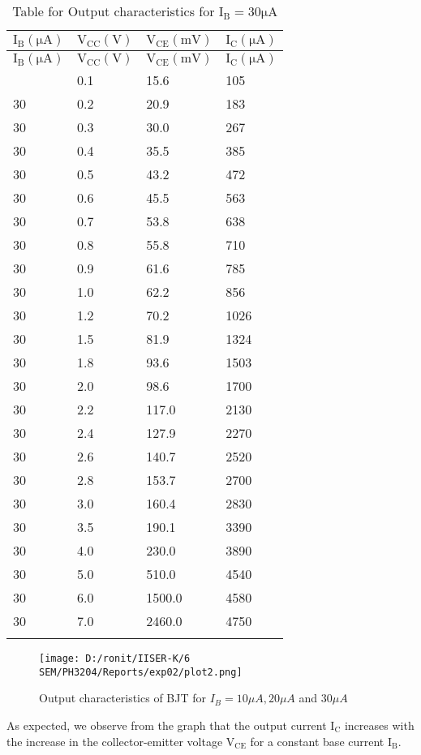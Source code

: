 \documentclass[12pt]{article}
\begin{document}
\begin{longtable}{|l|l|l|l|}
	\hline
    $\mathrm{I_{B}(\mu A)}$ & $\mathrm{V_{CC}(V)}$  & $\mathrm{V_{CE}(mV)}$&  $\mathrm{I_{C}(\mu A)}$ \\ \hline
	\endfirsthead
	\hline
    $\mathrm{I_{B}(\mu A)}$ & $\mathrm{V_{CC}(V)}$& $\mathrm{V_{CE}(mV)}$&  $\mathrm{I_{C}(\mu A)}$ \\ \hline
	\endhead
	\hline
	\endfoot
	\endlastfoot
    30  & 0.1  & 15.6  & 105  \\ \hline
    30  & 0.2  & 20.9  & 183  \\ \hline
    30  & 0.3  & 30.0  & 267  \\ \hline
    30  & 0.4  & 35.5  & 385  \\ \hline
    30  & 0.5  & 43.2  & 472  \\ \hline
    30  & 0.6  & 45.5  & 563  \\ \hline
    30  & 0.7  & 53.8  & 638  \\ \hline
    30  & 0.8  & 55.8  & 710  \\ \hline
    30  & 0.9  & 61.6  & 785  \\ \hline
    30  & 1.0  & 62.2  & 856  \\ \hline
    30  & 1.2  & 70.2  & 1026 \\ \hline
    30  & 1.5  & 81.9  & 1324 \\ \hline
    30  & 1.8  & 93.6  & 1503 \\ \hline
    30  & 2.0  & 98.6  & 1700 \\ \hline
    30  & 2.2  & 117.0 & 2130 \\ \hline
    30  & 2.4  & 127.9 & 2270 \\ \hline
    30  & 2.6  & 140.7 & 2520 \\ \hline
    30  & 2.8  & 153.7 & 2700 \\ \hline
    30  & 3.0  & 160.4 & 2830 \\ \hline
    30  & 3.5  & 190.1 & 3390 \\ \hline
    30  & 4.0  & 230.0 & 3890 \\ \hline
    30  & 5.0  & 510.0 & 4540 \\ \hline
    30  & 6.0  & 1500.0 & 4580 \\ \hline
    30  & 7.0  & 2460.0 & 4750 \\ \hline
\caption{Table for Output characteristics for $\mathrm{I_B=30 \mu A}$}
\end{longtable}
\begin{figure}[H]  
    \centering  
    \texttt{[image: D:/ronit/IISER-K/6 SEM/PH3204/Reports/exp02/plot2.png]}  %
    \caption{Output characteristics of BJT for $I_{B}=10\mu A,20\mu A$ and $30\mu A$}  %
    \label{fig:part01_02}  %
  \end{figure}\noindent
As expected, we observe from the graph that the output current $\mathrm{I_C}$ increases with the increase in the collector-emitter voltage $\mathrm{V_{CE}}$ for a constant base current $\mathrm{I_B}$.
\end{document}
